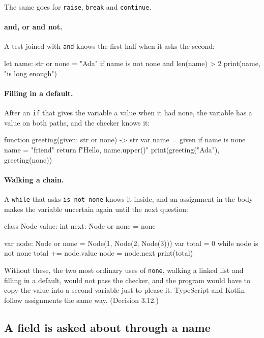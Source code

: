 The same goes for \verb|raise|, \verb|break| and \verb|continue|.

\paragraph{and, or and not.} A test joined with \verb|and| knows the
first half when it asks the second:

\begin{zeno}
let name: str or none = "Ada"
if name is not none and len(name) > 2 {
    print(name, "is long enough")
}
\end{zeno}

\paragraph{Filling in a default.} After an \verb|if| that gives the
variable a value when it had none, the variable has a value on both
paths, and the checker knows it:

\begin{zeno}
function greeting(given: str or none) -> str {
    var name = given
    if name is none {
        name = "friend"
    }
    return f"Hello, {name.upper()}"
}
print(greeting("Ada"), greeting(none))
\end{zeno}

\paragraph{Walking a chain.} A \verb|while| that asks
\verb|is not none| knows it inside, and an assignment in the body
makes the variable uncertain again until the next question:

\begin{zeno}
class Node {
    value: int
    next: Node or none = none
}

var node: Node or none = Node(1, Node(2, Node(3)))
var total = 0
while node is not none {
    total += node.value
    node = node.next
}
print(total)
\end{zeno}

\begin{why}
Without these, the two most ordinary uses of \verb|none|, walking a
linked list and filling in a default, would not pass the checker, and
the program would have to copy the value into a second variable just
to please it. TypeScript and Kotlin follow assignments the same way.
(Decision 3.12.)
\end{why}

\subsection{A field is asked about through a name}

